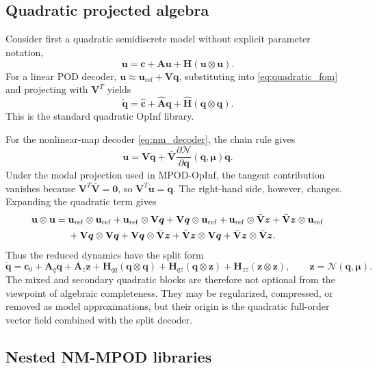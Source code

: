 \documentclass[11pt]{article}
\newcommand{\bu}{\mathbf u}
\newcommand{\bc}{\mathbf c}
\newcommand{\bq}{\boldsymbol q}
\newcommand{\bz}{\boldsymbol z}
\newcommand{\bmu}{\boldsymbol\mu}
\newcommand{\bzero}{\mathbf 0}
\newcommand{\bV}{\mathbf V}
\newcommand{\bVbar}{\bar{\mathbf V}}
\newcommand{\bA}{\mathbf A}
\newcommand{\bH}{\mathbf H}
\newcommand{\uref}{\mathbf u_{\mathrm{ref}}}
\newcommand{\Nmap}{\mathcal{N}}
\begin{document}
\subsection{Quadratic projected algebra}

Consider first a quadratic semidiscrete model without explicit parameter
notation,
\begin{equation}
  \dot{\bu}=\bc+\bA\bu+\bH(\bu\otimes\bu).
  \label{eq:quadratic_fom}
\end{equation}
For a linear POD decoder, $\bu\approx\uref+\bV\bq$, substituting into
\eqref{eq:quadratic_fom} and projecting with $\bV^T$ yields
\begin{equation}
  \dot{\bq}=\widehat{\bc}+\widehat{\bA}\bq
  +\widehat{\bH}(\bq\otimes\bq).
  \label{eq:linear_opinf_structure}
\end{equation}
This is the standard quadratic OpInf library.

For the nonlinear-map decoder \eqref{eq:nm_decoder}, the chain rule gives
\[
  \dot{\bu}
  =
  \bV\dot{\bq}
  +
  \bVbar
  \frac{\partial \Nmap}{\partial\bq}(\bq,\bmu)\dot{\bq}.
\]
Under the modal projection used in MPOD-OpInf, the tangent contribution
vanishes because $\bV^T\bVbar=\bzero$, so $\bV^T\dot{\bu}=\dot{\bq}$.  The
right-hand side, however, changes.  Expanding the quadratic term gives
\begin{align}
  \bu\otimes\bu
  ={}&
  \uref\otimes\uref
  +\uref\otimes\bV\bq
  +\bV\bq\otimes\uref
  +\uref\otimes\bVbar\bz
  +\bVbar\bz\otimes\uref
  \notag\\
  &+
  \bV\bq\otimes\bV\bq
  +\bV\bq\otimes\bVbar\bz
  +\bVbar\bz\otimes\bV\bq
  +\bVbar\bz\otimes\bVbar\bz.
  \label{eq:nm_expansion}
\end{align}
Thus the reduced dynamics have the split form
\begin{equation}
  \dot{\bq}
  =
  \bc_0+\bA_q\bq+\bA_z\bz
  +\bH_{qq}(\bq\otimes\bq)
  +\bH_{qz}(\bq\otimes\bz)
  +\bH_{zz}(\bz\otimes\bz),
  \qquad
  \bz=\Nmap(\bq,\bmu).
  \label{eq:qc_structure}
\end{equation}
The mixed and secondary quadratic blocks are therefore not optional from the
viewpoint of algebraic completeness.  They may be regularized, compressed, or
removed as model approximations, but their origin is the quadratic full-order
vector field combined with the split decoder.

\subsection{Nested NM-MPOD libraries}
\end{document}
